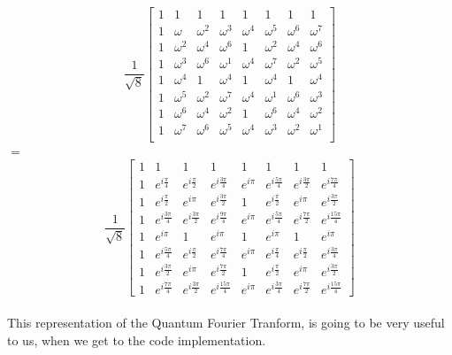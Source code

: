 \documentclass[inscr,ack,preface]{diphdthesis}
\begin{document}
\Large

\[
\frac{1}{\sqrt{8}}
\begin{bmatrix}
1 & 1 & 1 & 1 & 1 & 1 & 1 & 1 \\
1 & \omega & \omega^2 & \omega^3 & \omega^4 & \omega^5 & \omega^6 & \omega^7 \\
1 & \omega^2 & \omega^4 & \omega^6 & 1 & \omega^2 & \omega^4 & \omega^6 \\
1 & \omega^3 & \omega^6 & \omega^1 & \omega^4 & \omega^7 & \omega^2 & \omega^5 \\
1 & \omega^4 & 1 & \omega^4 & 1 & \omega^4 & 1 & \omega^4 \\
1 & \omega^5 & \omega^2 & \omega^7 & \omega^4 & \omega^1 & \omega^6 & \omega^3 \\
1 & \omega^6 & \omega^4 & \omega^2 & 1 & \omega^6 & \omega^4 & \omega^2 \\
1 & \omega^7 & \omega^6 & \omega^5 & \omega^4 & \omega^3 & \omega^2 & \omega^1 \\
\end{bmatrix}
\]
$=$\[
\frac{1}{\sqrt{8}} \begin{bmatrix}
1 & 1 & 1 & 1 & 1 & 1 & 1 & 1 \\
1 & e^{i\frac{\pi}{4}} & e^{i\frac{\pi}{2}} & e^{i\frac{3\pi}{4}} & e^{i\pi} & e^{i\frac{5\pi}{4}} & e^{i\frac{3\pi}{2}} & e^{i\frac{7\pi}{4}} \\
1 & e^{i\frac{\pi}{2}} & e^{i\pi} & e^{i\frac{3\pi}{2}} & 1 & e^{i\frac{\pi}{2}} & e^{i\pi} & e^{i\frac{3\pi}{2}} \\
1 & e^{i\frac{3\pi}{4}} & e^{i\frac{3\pi}{2}} & e^{i\frac{9\pi}{4}} & e^{i\pi} & e^{i\frac{5\pi}{4}} & e^{i\frac{7\pi}{2}} & e^{i\frac{15\pi}{4}} \\
1 & e^{i\pi} & 1 & e^{i\pi} & 1 & e^{i\pi} & 1 & e^{i\pi} \\
1 & e^{i\frac{5\pi}{4}} & e^{i\frac{\pi}{2}} & e^{i\frac{7\pi}{4}} & e^{i\pi} & e^{i\frac{\pi}{4}} & e^{i\frac{\pi}{2}} & e^{i\frac{3\pi}{4}} \\
1 & e^{i\frac{3\pi}{2}} & e^{i\pi} & e^{i\frac{7\pi}{2}} & 1 & e^{i\frac{\pi}{2}} & e^{i\pi} & e^{i\frac{3\pi}{2}} \\
1 & e^{i\frac{7\pi}{4}} & e^{i\frac{3\pi}{2}} & e^{i\frac{15\pi}{4}} & e^{i\pi} & e^{i\frac{3\pi}{4}} & e^{i\frac{7\pi}{2}} & e^{i\frac{15\pi}{4}}
\end{bmatrix}
\]
\normalsize 
\\This representation of the Quantum Fourier Tranform, is going to be very useful to us, when we get to the code implementation.
\end{document}
